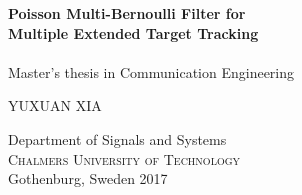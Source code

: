 
\begin{titlepage}
			
\addtolength{\voffset}{2cm}


\mbox{}
\vfill
\renewcommand{\familydefault}{\sfdefault} \normalfont %
\textbf{{\Huge 	Poisson Multi-Bernoulli Filter for	\\[0.2cm] 
				Multiple Extended Target Tracking }} 	\\[0.5cm]
{\Large }\\[0.5cm]
Master's thesis in Communication Engineering \setlength{\parskip}{1cm}

{\Large YUXUAN XIA} \setlength{\parskip}{2.9cm}

Department of Signals and Systems \\
\textsc{Chalmers University of Technology} \\
Gothenburg, Sweden 2017

\renewcommand{\familydefault}{\rmdefault} \normalfont %
\end{titlepage}


\newpage
\restoregeometry
\thispagestyle{empty}
\mbox{}


